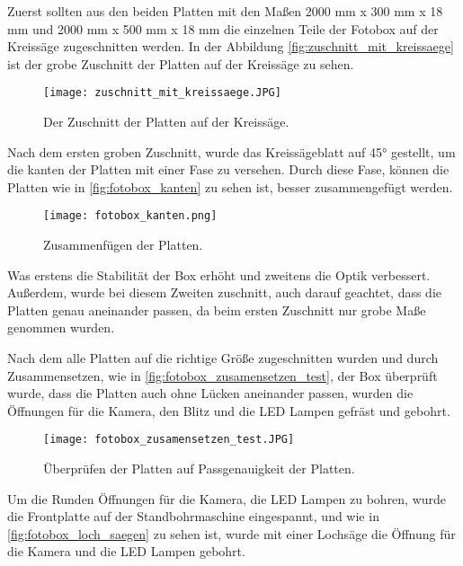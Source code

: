 Zuerst sollten aus den beiden Platten mit den Maßen 2000 mm x 300 mm x 18 mm und 
2000 mm x 500 mm x 18 mm die einzelnen Teile der Fotobox auf der Kreissäge
zugeschnitten werden. In der Abbildung \autoref{fig:zuschnitt_mit_kreissaege} ist der grobe 
Zuschnitt der Platten auf der Kreissäge zu sehen.

\begin{figure}[H]
    \centering
    \texttt{[image: zuschnitt\_mit\_kreissaege.JPG]}
    \caption{Der Zuschnitt der Platten auf der Kreissäge.}
    \label{fig:zuschnitt_mit_kreissaege}
\end{figure}

Nach dem ersten groben Zuschnitt, wurde das Kreissägeblatt auf 45° gestellt, um
die kanten der Platten mit einer Fase zu versehen. Durch diese Fase, können die Platten
wie in \autoref{fig:fotobox_kanten} zu sehen ist, besser zusammengefügt werden.

\begin{figure}[H]
    \centering
    \texttt{[image: fotobox\_kanten.png]}
    \caption{Zusammenfügen der Platten.}
    \label{fig:fotobox_kanten}
\end{figure}

Was erstens die Stabilität der Box erhöht und zweitens die Optik verbessert. 
Außerdem, wurde bei diesem Zweiten zuschnitt, auch darauf geachtet, dass die
Platten genau aneinander passen, da beim ersten Zuschnitt nur grobe Maße
genommen wurden.

\newpage

Nach dem alle Platten auf die richtige Größe zugeschnitten wurden und durch
Zusammensetzen, wie in \autoref{fig:fotobox_zusamensetzen_test}, der Box überprüft
wurde, dass die Platten auch ohne Lücken aneinander passen, wurden die Öffnungen
für die Kamera, den Blitz und die LED Lampen gefräst und gebohrt.

\begin{figure}[H]
    \centering
    \texttt{[image: fotobox\_zusamensetzen\_test.JPG]}
    \caption{Überprüfen der Platten auf Passgenauigkeit der Platten.}
    \label{fig:fotobox_zusamensetzen_test}
\end{figure}

Um die Runden Öffnungen für die Kamera, die LED Lampen zu bohren, wurde die Frontplatte
auf der Standbohrmaschine eingespannt, und wie in \autoref{fig:fotobox_loch_saegen} zu sehen ist,
wurde mit einer Lochsäge die Öffnung für die Kamera und die LED Lampen gebohrt.

